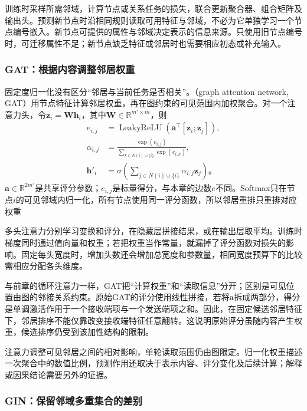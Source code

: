 训练时采样所需邻域，计算节点或关系任务的损失，联合更新聚合器、组合矩阵及输出头。预测新节点时沿相同规则读取可用特征与邻域，不必为它单独学习一个节点编号嵌入。新节点可提供的属性与邻域决定表示的信息来源。只使用旧节点编号时，可迁移属性不足；新节点缺乏特征或邻居时也需要相应初态或补充输入。

\subsubsection{GAT：根据内容调整邻居权重}
\label{sec:gnn-gat}

固定度归一化没有区分“邻居与当前任务是否相关”。（graph attention network, GAT）用节点特征计算邻居权重，再在图约束的可见范围内加权聚合。对一个注意力头，令$\bm{z}_i=\bm{W}\bm{h}_i$，其中$\bm{W}\in\mathbb{R}^{m'\times m}$，则
\begin{equation}
  \begin{aligned}
    e_{i,j}&=\operatorname{LeakyReLU}
      \!\left(\bm{a}^{\top}[\bm{z}_i;\bm{z}_j]\right),\\
    \alpha_{i,j}&=\frac{\exp(e_{i,j})}
      {\sum_{k\in N(i)\cup\{i\}}\exp(e_{i,k})},\\
    \bm{h}'_i&=\sigma\!\left(\sum_{j\in N(i)\cup\{i\}}
      \alpha_{i,j}\bm{z}_j\right)\text{。}
  \end{aligned}
  \label{eq:gnn-gat}
\end{equation}
$\bm{a}\in\mathbb{R}^{2m'}$是共享评分参数；$e_{i,j}$是标量得分，与本章的边数$e$不同。Softmax只在节点$i$的可见邻域内归一化，所有节点使用同一评分函数，所以邻居重排只重排对应权重

多头注意力分别学习变换和评分，在隐藏层拼接结果，或在输出层取平均。训练时梯度同时通过值向量和权重；若把权重当作常量，就漏掉了评分函数对损失的影响。固定每头宽度时，增加头数还会增加总宽度和参数量，相同宽度预算下的比较需相应分配各头维度。

与前章的循环注意力一样，GAT把“计算权重”和“读取信息”分开；区别是可见位置由图的邻接关系约束。原始GAT的评分使用线性拼接，若将$\bm{a}$拆成两部分，得分是单调激活作用于一个接收端项与一个发送端项之和。因此，在固定候选邻居特征下，邻居排序不能仅靠改变接收端特征任意翻转。这说明原始评分虽随内容产生权重，候选排序仍受到该加性结构的限制。

注意力调整可见邻居之间的相对影响，单轮读取范围仍由图限定。归一化权重描述一次聚合中的数值比例，预测作用还取决于表示内容、评分变化及后续计算；解释或因果结论需要另外的证据。

\subsubsection{GIN：保留邻域多重集合的差别}
\label{sec:gnn-gin}

